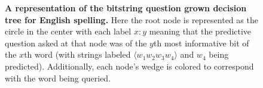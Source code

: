\documentclass[12pt]{article}
\begin{document}
\begin{figure}
  \centering
  \caption{\textbf{A representation of the bitstring question grown
      decision tree for English spelling.} Here the root node is
    represented as the circle in the center with each label $x:y$
    meaning that the predictive question asked at that node was of the
    $y$th most informative bit of the $x$th word (with strings labeled
    $\langle w_1 w_2 w_3 w_4 \rangle$ and $w_4$ being
    predicted). Additionally, each node's wedge is colored to
    correspond with the word being queried.}
  \label{fig:bs_wedges}
\end{figure}
\end{document}

